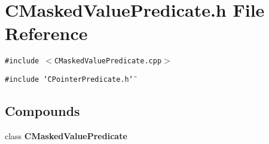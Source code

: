 \section{CMasked\-Value\-Predicate.h File Reference}
\label{CMaskedValuePredicate_8h}
{\tt \#include $<$CMasked\-Value\-Predicate.cpp$>$}\par
{\tt \#include \char`\"{}CPointer\-Predicate.h\char`\"{}}\par
\subsection*{Compounds}
\begin{CompactItemize}
\item 
class {\bf CMasked\-Value\-Predicate}
\end{CompactItemize}
